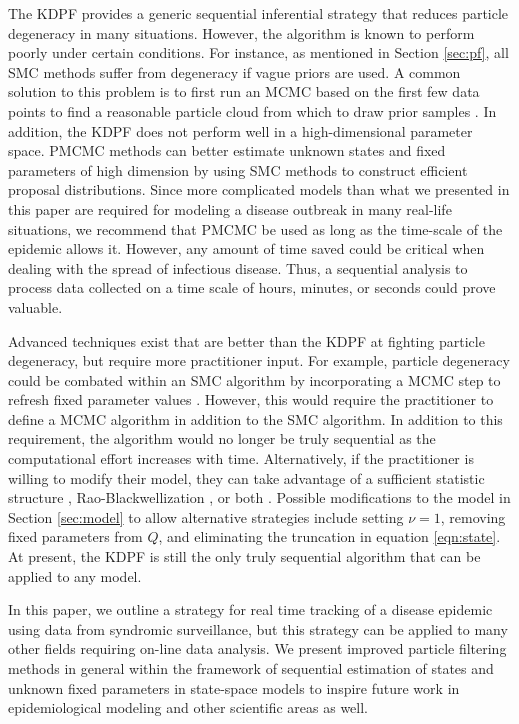 \documentclass{elsarticle}
\begin{document}
The KDPF provides a generic sequential inferential strategy that reduces particle degeneracy in many situations. However, the algorithm is known to perform poorly under certain conditions. For instance, as mentioned in Section \ref{sec:pf}, all SMC methods suffer from degeneracy if vague priors are used. A common solution to this problem is to first run an MCMC based on the first few data points to find a reasonable particle cloud from which to draw prior samples \citep{petris2009dynamic}. In addition, the KDPF does not perform well in a high-dimensional parameter space. PMCMC methods can better estimate unknown states and fixed parameters of high dimension by using SMC methods to construct efficient proposal distributions. Since more complicated models than what we presented in this paper are required for modeling a disease outbreak in many real-life situations, we recommend that PMCMC be used as long as the time-scale of the epidemic allows it. However, any amount of time saved could be critical when dealing with the spread of infectious disease. Thus, a sequential analysis to process data collected on a time scale of hours, minutes, or seconds could prove valuable.
 
Advanced techniques exist that are better than the KDPF at fighting particle degeneracy, but require more practitioner input. For example, particle degeneracy could be combated within an SMC algorithm by incorporating a MCMC step to refresh fixed parameter values \citep{Gilk:Berz:foll:2001,Stor:part:2002}. However, this would require the practitioner to define a MCMC algorithm in addition to the SMC algorithm. In addition to this requirement, the algorithm would no longer be truly sequential as the computational effort increases with time. Alternatively, if the practitioner is willing to modify their model, they can take advantage of a sufficient statistic structure \citep{Fear:mark:2002}, Rao-Blackwellization \citep{Douc:Gods:Andr:on:2000}, or both \citep{carvalho2010particle}. Possible modifications to the model in Section \ref{sec:model} to allow alternative strategies include setting $\nu=1$, removing fixed parameters from $Q$, and eliminating the truncation in equation \eqref{eqn:state}. At present, the KDPF is still the only truly sequential algorithm that can be applied to any model.

In this paper, we outline a strategy for real time tracking of a disease epidemic using data from syndromic surveillance, but this strategy can be applied to many other fields requiring on-line data analysis. We present improved particle filtering methods in general within the framework of sequential estimation of states and unknown fixed parameters in state-space models to inspire future work in epidemiological modeling and other scientific areas as well.

\clearpage



\end{document}
